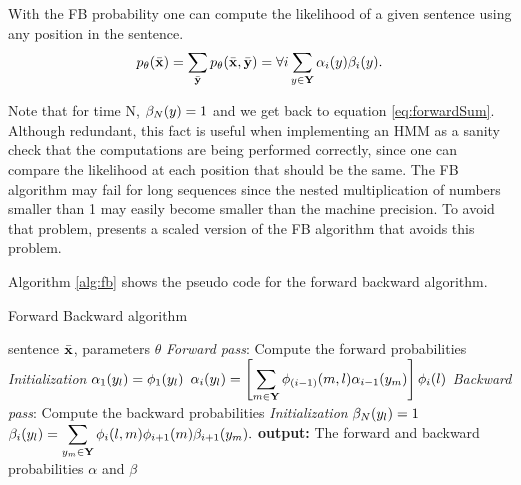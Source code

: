 With the FB probability one can compute the likelihood of a given sentence using any position in the sentence.
\begin{equation}
\label{eq::fbsanity}
  p_{\theta}(\bar{\mathbf{x}}) = \displaystyle \sum_{\bar{\mathbf{y}}} p_{\theta}(\bar{\mathbf{x}} ,\bar{\mathbf{y}}) =  \forall{i}
  \displaystyle \sum_{{y} \in \mathbf{Y}} \alpha_i({y}) \beta_i({y}).
\end{equation}

Note that for time N, $\beta_N({y}) = 1$ and we get back to equation
\ref{eq:forwardSum}. Although redundant, this fact is useful when implementing an
HMM as a sanity check that the computations are being performed
correctly, since one can compare the likelihood at each position that
should be the same. The FB algorithm may fail for long
sequences since the nested multiplication of numbers smaller than 1
may easily become smaller than the machine precision. To avoid that
problem, \cite{rabiner} presents a scaled version of the FB algorithm that avoids this problem.

Algorithm \ref{alg:fb} shows the pseudo code for the forward backward algorithm.

\begin{algorithm}[t]
   \caption{Forward Backward algorithm \label{alg:fb}}
\begin{algorithmic}[1]
    sentence $\bar{\mathbf{x}}$, parameters $\theta$
        \STATE  \emph{Forward pass}: Compute the forward probabilities
        \STATE \emph{Initialization}
        \STATE $\alpha_1({y}_l) = \phi_1({y}_l)$
        \ENDFOR 
                 \STATE $\alpha_i({y}_l) = \left[ \displaystyle
                   \sum_{m  \in \mathbf{Y}} \phi_{(i-1)}(m,l)
                   \alpha_{i-1}({y}_m) \right] \phi_i(l)$
         \ENDFOR 
        \ENDFOR 
       \STATE \emph{Backward pass}: Compute the backward probabilities
       \STATE \emph{Initialization}
        \STATE $\beta_N({y}_l) = 1$
        \ENDFOR 
        \STATE $\beta_i({y}_l) = \displaystyle \sum_{{y}_m \in \mathbf{Y}} \phi_i(l,m)\phi_{i+1}(m) \beta_{i+1}({y}_m).$
        \ENDFOR 
       \STATE \textbf{output:} The forward and backward probabilities
       $\alpha$ and $\beta$
\end{algorithmic}
\end{algorithm}




